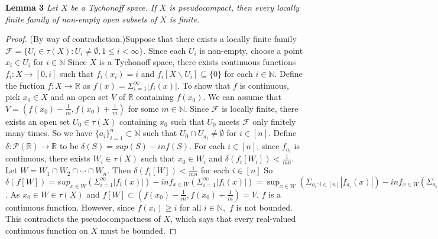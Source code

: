 \documentclass{amsart}
\author{shaun yi cheng}
\begin{document}
\textbf{Lemma 3}
\emph{Let $X$ be a Tychonoff space. If $X$ is pseudocompact, then every locally finite family of non-empty open subsets of $X$ is finite.}

\begin{proof}
(By way of contradiction.)Suppose that there exists a locally finite family $\mathcal{F}=\{U_i \in \tau(X): U_i\neq \emptyset, 1\leq i < \infty\}$. Since each $U_i$ is non-empty, choose a point $x_i\in U_i$ for $i\in \mathbb{N}$ Since 
$X$ is a Tychonoff space, there exists continuous functions $f_i:X \rightarrow [0,i]$ such that $f_i(x_i)=i$ and 
$f_i[X \backslash U_i] \subseteq \{0\}$ for each $i \in \mathbb{N}$. Define the fuction $f:X\rightarrow \mathbb{R}$ as $f(x)=\Sigma_{i=1}^\infty |f_i(x)|$. To show that $f$ is continuous, pick $x_0\in X$ and an open set $V$ of $\mathbb{R}$ containing $f(x_0)$. 
We can assume that  $V=(f(x_0)-\frac{1}{m}, f(x_0)+\frac{1}{m})$ for some $m \in \mathbb{N}$.
Since $\mathcal{F}$ is locally finite, there exists an open set $U_0 \in \tau(X)$ containing $x_0$ such that $U_0$ meets $\mathcal{F}$ only finitely many times. 
So we have $\{a_i\}_{i=1}^{n} \subset \mathbb{N}$ such that $U_0\cap U_{a_i} \neq \emptyset$ for $i\in [n].$
Define $\delta: \mathcal{P}(\mathbb{R}) \rightarrow \mathbb{R}$ to be $\delta(S)=sup (S) - inf (S).$
For each $i \in [n]$, since  $f_{a_i}$ is continuous, there exists $W_i \in \tau(X)$ 
such that $x_0\in W_i$ and  $\delta(f_i[W_i])<\frac{1}{mn}$. 
Let $W=W_1 \cap W_2 \cap \cdots \cap W_n$. 
Then $\delta(f_i[W])< \frac{1}{mn}$ for each $i\in [n]$ 
So $\delta(f[W])=sup_{x\in W}(\Sigma_{i=1}^\infty |f_i(x)|)-inf_{x\in W}(\Sigma_{i=1}^\infty |f_i(x)|) 
=\sup_{x\in W}(\Sigma_{a_i: i\in [n]} |f_{a_i}(x)|)-inf_{x\in W}(\Sigma_{a_i: i\in [n]}|f_{a_i}(x)|)
=\Sigma_{a_i: i\in [n]}(\sup_{x\in W}( |f_{a_i}(x)|)-inf_{x\in W}|f_{a_i}(x)|)<n\frac{1}{mn}=\frac{1}{m}$. 
As $x_0\in W\in \tau(X)$ and $f[W]\subset (f(x_0)-\frac{1}{m}, f(x_0)+\frac{1}{m})=V$, $f$ is a continuous function. 
However, since $f(x_i) \geq i$ for all $i\in \mathbb{N},$ $f$ is  not bounded. This contradicts the pseudocompactness of $X$, which says that every real-valued continuous function on $X$ must be bounded.



\end{proof}
\end{document}
